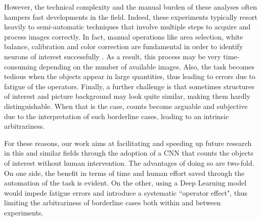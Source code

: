 However, the technical complexity and the manual burden of these analyses often hampers fast developments in the field.
Indeed, these experiments typically resort heavily to semi-automatic techniques that involve multiple steps to acquire and process images correctly.  
In fact,  manual operations like area selection, white balance, calibration and color correction are fundamental in order to identify neurons of interest successfully \cite{luppi1, luppi2, luppi3}. 
As a result, this process may be very time-consuming depending on the number of available images. 
Also, the task becomes tedious when the objects appear in large quantities, thus leading to errors due to fatigue of the operators.
Finally, a further challenge is that sometimes structures of interest and picture background may look quite similar, making them hardly distinguishable. When that is the case, counts become arguable and subjective due to the interpretation of such borderline cases, leading to an intrinsic arbitrariness.

For these reasons, our work aims at facilitating and speeding up future research in this and similar fields through the adoption of a CNN that counts the objects of interest without human intervention.
The advantages of doing so are two-fold. 
On one side, the benefit in terms of time and human effort saved through the automation of the task is evident.
On the other, using a Deep Learning model would impede fatigue errors and introduce a systematic ``operator effect", thus limiting the arbitrariness of borderline cases both within and between experiments.

